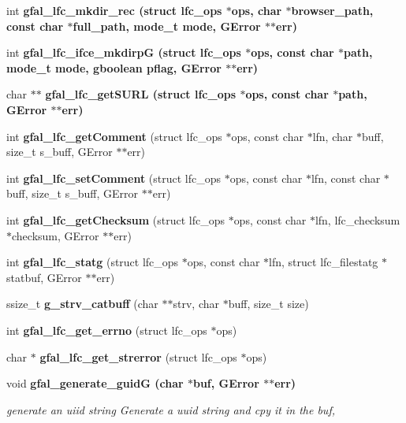 \begin{CompactItemize}
\item 
int \bf{gfal\_\-lfc\_\-mkdir\_\-rec} (struct lfc\_\-ops $\ast$ops, char $\ast$browser\_\-path, const char $\ast$full\_\-path, mode\_\-t mode, GError $\ast$$\ast$err)
\item 
int \bf{gfal\_\-lfc\_\-ifce\_\-mkdirp\-G} (struct lfc\_\-ops $\ast$ops, const char $\ast$path, mode\_\-t mode, gboolean pflag, GError $\ast$$\ast$err)
\item 
char $\ast$$\ast$ \bf{gfal\_\-lfc\_\-get\-SURL} (struct lfc\_\-ops $\ast$ops, const char $\ast$path, GError $\ast$$\ast$err)
\item 
int \textbf{gfal\_\-lfc\_\-get\-Comment} (struct lfc\_\-ops $\ast$ops, const char $\ast$lfn, char $\ast$buff, size\_\-t s\_\-buff, GError $\ast$$\ast$err)\label{lfc__ifce__ng_8c_71ac937c7262a53247ea1b204ae23c6c}

\item 
int \textbf{gfal\_\-lfc\_\-set\-Comment} (struct lfc\_\-ops $\ast$ops, const char $\ast$lfn, const char $\ast$buff, size\_\-t s\_\-buff, GError $\ast$$\ast$err)\label{lfc__ifce__ng_8c_0b9952562acf59969aefc9519956f877}

\item 
int \textbf{gfal\_\-lfc\_\-get\-Checksum} (struct lfc\_\-ops $\ast$ops, const char $\ast$lfn, lfc\_\-checksum $\ast$checksum, GError $\ast$$\ast$err)\label{lfc__ifce__ng_8c_3285a6a2cf6d76aa8fadabaee79f7896}

\item 
int \textbf{gfal\_\-lfc\_\-statg} (struct lfc\_\-ops $\ast$ops, const char $\ast$lfn, struct lfc\_\-filestatg $\ast$statbuf, GError $\ast$$\ast$err)\label{lfc__ifce__ng_8c_220714510c3f197e656ddea9f04ffec3}

\item 
ssize\_\-t \textbf{g\_\-strv\_\-catbuff} (char $\ast$$\ast$strv, char $\ast$buff, size\_\-t size)\label{lfc__ifce__ng_8c_bc04cd8d7342170700f02f6297fc4105}

\item 
int \textbf{gfal\_\-lfc\_\-get\_\-errno} (struct lfc\_\-ops $\ast$ops)\label{lfc__ifce__ng_8c_caa53981228e722b2175cfd7b4ca051c}

\item 
char $\ast$ \textbf{gfal\_\-lfc\_\-get\_\-strerror} (struct lfc\_\-ops $\ast$ops)\label{lfc__ifce__ng_8c_58172b62403dfd7a7b742548f074cd44}

\item 
void \bf{gfal\_\-generate\_\-guid\-G} (char $\ast$buf, GError $\ast$$\ast$err)
\begin{CompactList}\small\item\em generate an uiid string Generate a uuid string and cpy it in the buf, \item\end{CompactList}\end{CompactItemize}



